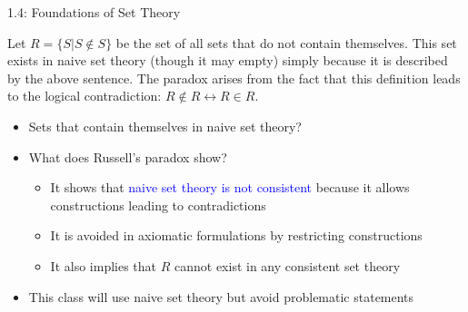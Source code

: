 \documentclass[10pt,english,aspectratio=169]{beamer}
\begin{document}
\begin{frame}{1.4: Foundations of Set Theory}

\begin{example}
Let $R = \{S|S\notin S\}$ be the set of all sets that do not contain themselves.
This set exists in naive set theory (though it may empty) simply because it is described by the above sentence.
The paradox arises from the fact that this definition leads to the logical contradiction: $R\notin R \leftrightarrow R\in R$.
\end{example}

\vspace{-3mm}

\begin{itemize}
\setlength\itemsep{3mm}
\item<2-> Sets that contain themselves in naive set theory? \vspace{2mm}
 
\item<3-> What does Russell's paradox show? \vspace{1mm}
\begin{itemize} 
  \setlength\itemsep{1.5mm}
  \item It shows that \textcolor{blue}{naive set theory is not consistent} because it allows constructions leading to contradictions
  \item It is avoided in axiomatic formulations by restricting constructions
  \item It also implies that $R$ cannot exist in any consistent set theory
\end{itemize}

\item<4-> This class will use naive set theory but avoid problematic statements

\end{itemize}


\end{frame}
\end{document}
